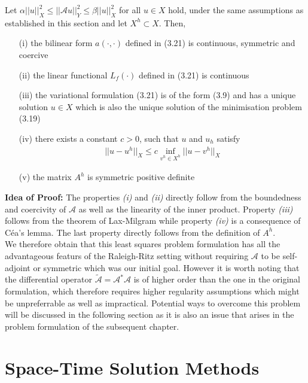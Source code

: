 \documentclass[../draft_1.tex]{subfiles}
\begin{document}
\begin{Theorem}
	Let $\alpha || u ||_X^2 \leq || \mathcal{A} u ||_Y^2 \leq \beta || u ||_X^2$ for all $u \in X$ hold, under the same assumptions as established in this section and let $X^h \subset X$. Then, 
	\begin{itemize}
		\item[(i)] the bilinear form $a(\cdot, \cdot)$ defined in (3.21) is continuous, symmetric and coercive
		\item[(ii)] the linear functional $L_f(\cdot)$ defined in (3.21) is continuous
		\item[(iii)] the variational formulation (3.21) is of the form (3.9) and has a unique solution $u \in X$ which is also the unique solution of the minimisation problem (3.19)
		\item[(iv)] there exists a constant $c > 0$, such that $u$ and $u_h$ satisfy 
		\begin{align}
		|| u - u^h ||_X \leq c \inf_{v^h \in X^h} || u - v^h||_X
		\end{align}
	    \item[(v)]	the matrix $A^h$ is symmetric positive definite	
	\end{itemize}
\end{Theorem}

\textbf{Idea of Proof:} The properties \textit{(i)} and \textit{(ii)} directly follow from the boundedness and coercivity of $\mathcal{A}$ as well as the linearity of the inner product. Property \textit{(iii)} follows from the theorem of Lax-Milgram while property \textit{(iv)} is a consequence of C\'{e}a's lemma. The last property directly follows from the definition of $A^h$.
\smallskip
\\
We therefore obtain that this least squares problem formulation has all the advantageous featurs of the Raleigh-Ritz setting without requiring $\mathcal{A}$ to be self-adjoint or symmetric which was our initial goal. However it is worth noting that the differential operator $\tilde{\mathcal{A}} = \mathcal{A}^* \mathcal{A}$ is of higher order than the one in the original formulation, which therefore requires higher regularity assumptions which might be unpreferrable as well as impractical. Potential ways to overcome this problem will be discussed in the following section as it is also an issue that arises in the problem formulation of the subsequent chapter.

\section{Space-Time Solution Methods}
\end{document}
